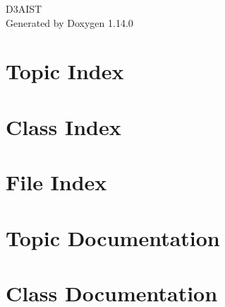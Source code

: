 \documentclass[twoside]{book}
\newcommand{\+}{\discretionary{\mbox{\scriptsize$\hookleftarrow$}}{}{}}
\newcommand{\clearemptydoublepage}{%
    \newpage{\pagestyle{empty}\cleardoublepage}%
  }
\begin{document}
  \raggedbottom
    \hypersetup{pageanchor=false,
                bookmarksnumbered=true,
                pdfencoding=unicode
               }
  \begin{titlepage}
  \vspace*{7cm}
  \begin{center}%
  {\Large D3\+AIST}\\
  \vspace*{1cm}
  {\large Generated by Doxygen 1.14.0}\\
  \end{center}
  \end{titlepage}
  \clearemptydoublepage
  \tableofcontents
  \clearemptydoublepage
  \hypersetup{pageanchor=true}
\chapter{Topic Index}

\chapter{Class Index}

\chapter{File Index}

\chapter{Topic Documentation}





\chapter{Class Documentation}











\end{document}
